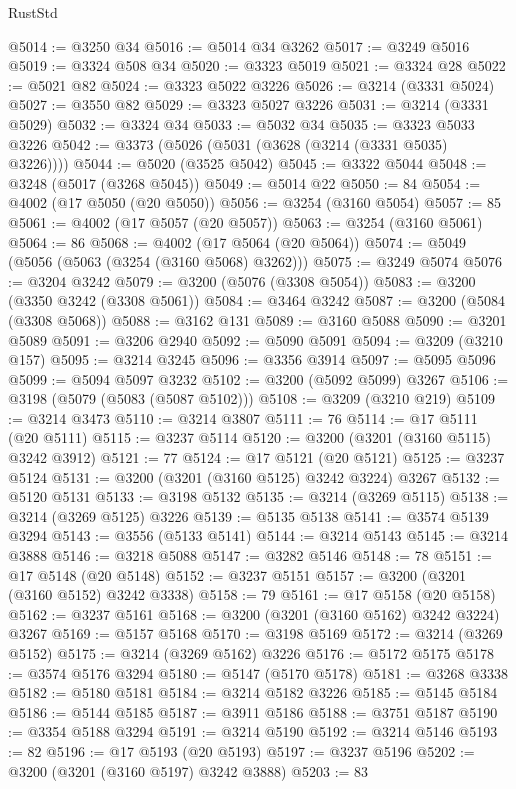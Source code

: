 \begin{lexlean}{RustStd}
\begin{coremodule}
@5014 := @3250 @34
@5016 := @5014 @34 @3262
@5017 := @3249 @5016
@5019 := @3324 @508 @34
@5020 := @3323 @5019
@5021 := @3324 @28
@5022 := @5021 @82
@5024 := @3323 @5022 @3226
@5026 := @3214 (@3331 @5024)
@5027 := @3550 @82
@5029 := @3323 @5027 @3226
@5031 := @3214 (@3331 @5029)
@5032 := @3324 @34
@5033 := @5032 @34
@5035 := @3323 @5033 @3226
@5042 := @3373 (@5026 (@5031 (@3628 (@3214 (@3331 @5035) @3226))))
@5044 := @5020 (@3525 @5042)
@5045 := @3322 @5044
@5048 := @3248 (@5017 (@3268 @5045))
@5049 := @5014 @22
@5050 := 84
@5054 := @4002 (@17 @5050 (@20 @5050))
@5056 := @3254 (@3160 @5054)
@5057 := 85
@5061 := @4002 (@17 @5057 (@20 @5057))
@5063 := @3254 (@3160 @5061)
@5064 := 86
@5068 := @4002 (@17 @5064 (@20 @5064))
@5074 := @5049 (@5056 (@5063 (@3254 (@3160 @5068) @3262)))
@5075 := @3249 @5074
@5076 := @3204 @3242
@5079 := @3200 (@5076 (@3308 @5054))
@5083 := @3200 (@3350 @3242 (@3308 @5061))
@5084 := @3464 @3242
@5087 := @3200 (@5084 (@3308 @5068))
@5088 := @3162 @131
@5089 := @3160 @5088
@5090 := @3201 @5089
@5091 := @3206 @2940
@5092 := @5090 @5091
@5094 := @3209 (@3210 @157)
@5095 := @3214 @3245
@5096 := @3356 @3914
@5097 := @5095 @5096
@5099 := @5094 @5097 @3232
@5102 := @3200 (@5092 @5099) @3267
@5106 := @3198 (@5079 (@5083 (@5087 @5102)))
@5108 := @3209 (@3210 @219)
@5109 := @3214 @3473
@5110 := @3214 @3807
@5111 := 76
@5114 := @17 @5111 (@20 @5111)
@5115 := @3237 @5114
@5120 := @3200 (@3201 (@3160 @5115) @3242 @3912)
@5121 := 77
@5124 := @17 @5121 (@20 @5121)
@5125 := @3237 @5124
@5131 := @3200 (@3201 (@3160 @5125) @3242 @3224) @3267
@5132 := @5120 @5131
@5133 := @3198 @5132
@5135 := @3214 (@3269 @5115)
@5138 := @3214 (@3269 @5125) @3226
@5139 := @5135 @5138
@5141 := @3574 @5139 @3294
@5143 := @3556 (@5133 @5141)
@5144 := @3214 @5143
@5145 := @3214 @3888
@5146 := @3218 @5088
@5147 := @3282 @5146
@5148 := 78
@5151 := @17 @5148 (@20 @5148)
@5152 := @3237 @5151
@5157 := @3200 (@3201 (@3160 @5152) @3242 @3338)
@5158 := 79
@5161 := @17 @5158 (@20 @5158)
@5162 := @3237 @5161
@5168 := @3200 (@3201 (@3160 @5162) @3242 @3224) @3267
@5169 := @5157 @5168
@5170 := @3198 @5169
@5172 := @3214 (@3269 @5152)
@5175 := @3214 (@3269 @5162) @3226
@5176 := @5172 @5175
@5178 := @3574 @5176 @3294
@5180 := @5147 (@5170 @5178)
@5181 := @3268 @3338
@5182 := @5180 @5181
@5184 := @3214 @5182 @3226
@5185 := @5145 @5184
@5186 := @5144 @5185
@5187 := @3911 @5186
@5188 := @3751 @5187
@5190 := @3354 @5188 @3294
@5191 := @3214 @5190
@5192 := @3214 @5146
@5193 := 82
@5196 := @17 @5193 (@20 @5193)
@5197 := @3237 @5196
@5202 := @3200 (@3201 (@3160 @5197) @3242 @3888)
@5203 := 83

\end{coremodule}
\end{lexlean}

